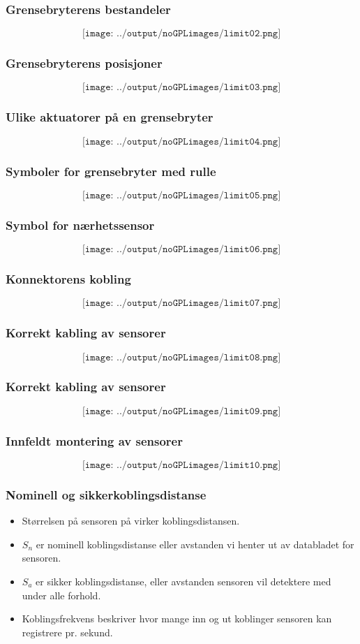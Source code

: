 \documentclass[aspectratio=169,xcolor=dvipsnames]{beamer}
\begin{document}
\begin{frame}
	\frametitle{Grensebryterens bestandeler}
	$$\texttt{[image: ../output/noGPLimages/limit02.png]}$$
\end{frame}
\begin{frame}
	\frametitle{Grensebryterens posisjoner}
	$$\texttt{[image: ../output/noGPLimages/limit03.png]}$$
\end{frame}
\begin{frame}
	\frametitle{Ulike aktuatorer på en grensebryter}
	$$\texttt{[image: ../output/noGPLimages/limit04.png]}$$
\end{frame}
\begin{frame}
	\frametitle{Symboler for grensebryter med rulle}
	$$\texttt{[image: ../output/noGPLimages/limit05.png]}$$
\end{frame}
\begin{frame}
	\frametitle{Symbol for nærhetssensor}
	$$\texttt{[image: ../output/noGPLimages/limit06.png]}$$
\end{frame}
\begin{frame}
	\frametitle{Konnektorens kobling}
	$$\texttt{[image: ../output/noGPLimages/limit07.png]}$$
\end{frame}
\begin{frame}
	\frametitle{Korrekt kabling av sensorer}
	$$\texttt{[image: ../output/noGPLimages/limit08.png]}$$
\end{frame}
\begin{frame}
	\frametitle{Korrekt kabling av sensorer}
	$$\texttt{[image: ../output/noGPLimages/limit09.png]}$$
\end{frame}
\begin{frame}
	\frametitle{Innfeldt montering av sensorer}
	$$\texttt{[image: ../output/noGPLimages/limit10.png]}$$
\end{frame}
\begin{frame}
	\frametitle{Nominell og sikkerkoblingsdistanse}
	\begin{itemize}
		\item Størrelsen på sensoren på virker koblingsdistansen. 
		\item $S_n$ er nominell koblingsdistanse eller avstanden vi henter ut av databladet for sensoren. 
		\item $S_a$ er sikker koblingsdistanse, eller avstanden sensoren vil detektere med under alle forhold. 
		\item Koblingsfrekvens beskriver hvor mange inn og ut koblinger sensoren kan registrere pr. sekund. 
	\end{itemize}

	
\end{frame}
\end{document}
